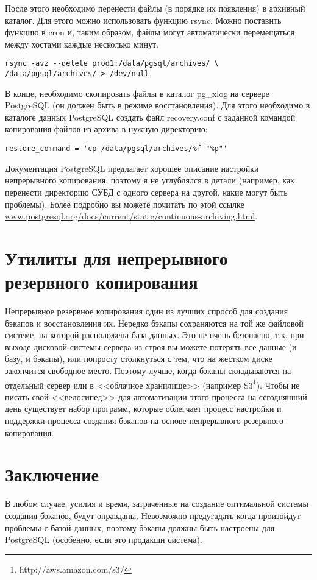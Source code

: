 После этого необходимо перенести файлы (в порядке их появления) в архивный каталог. 
Для этого можно использовать функцию rsync.
Можно поставить функцию в cron и, таким образом, файлы могут автоматически перемещаться между 
хостами каждые несколько минут.
\begin{lstlisting}[label=lst:backups16,caption=Копирование WAL файлов на другой хост]
rsync -avz --delete prod1:/data/pgsql/archives/ \
/data/pgsql/archives/ > /dev/null
\end{lstlisting}

В конце, необходимо скопировать файлы в каталог pg\_xlog на сервере PostgreSQL (он должен быть в режиме восстановления). 
Для этого необходимо в каталоге данных PostgreSQL создать файл recovery.conf с заданной командой копирования 
файлов из архива в нужную директорию:
\begin{lstlisting}[label=lst:backups17,caption=recovery.conf]
restore_command = 'cp /data/pgsql/archives/%f "%p"'
\end{lstlisting}

Документация PostgreSQL предлагает хорошее описание настройки непрерывного копирования, поэтому я не углублялся в детали 
(например, как перенести директорию СУБД с одного сервера на другой, какие могут быть проблемы). Более подробно вы 
можете почитать по этой ссылке \href{http://www.postgresql.org/docs/current/static/continuous-archiving.html}{www.postgresql.org/docs/current/static/continuous-archiving.html}.

\section{Утилиты для непрерывного резервного копирования}
Непрерывное резервное копирования один из лучших спрособ для создания бэкапов и восстановления их. Нередко бэкапы сохраняются на той же файловой системе, на которой расположена база данных. Это не очень безопасно, т.к. при выходе дисковой системы сервера из строя вы можете потерять все данные (и базу, и бэкапы), или попросту столкнуться с тем, что на жестком диске закончится свободное место. Поэтому лучше, когда бэкапы складываются на отдельный сервер или в <<облачное хранилище>> (например S3\footnote{http://aws.amazon.com/s3/}). Чтобы не писать свой <<велосипед>> для автоматизации этого процесса на сегодняшний день существует набор программ, которые облегчает процесс настройки и поддержки процесса создания бэкапов на основе непрерывного резервного копирования.




\section{Заключение}
В любом случае, усилия и время, затраченные на создание оптимальной системы создания бэкапов, будут оправданы. 
Невозможно предугадать когда произойдут проблемы с базой данных, поэтому бэкапы должны быть настроены для PostgreSQL 
(особенно, если это продакшн система).
